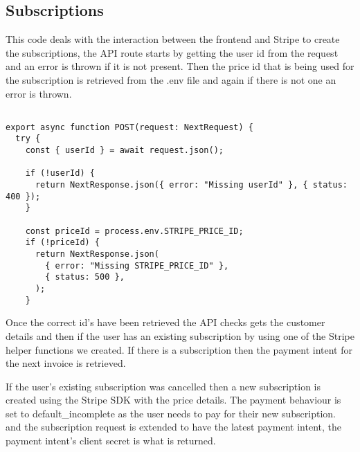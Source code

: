 \documentclass[]{project_report}
\begin{document}
\subsection{Subscriptions}

This code deals with the interaction between the frontend and Stripe to create the subscriptions, the API route starts by getting the user id from the request and an error is thrown if it is not present. Then the price id that is being used for the subscription is retrieved from the .env file and again if there is not one an error is thrown.

\begin{verbatim}

export async function POST(request: NextRequest) {
  try {
    const { userId } = await request.json();

    if (!userId) {
      return NextResponse.json({ error: "Missing userId" }, { status: 400 });
    }

    const priceId = process.env.STRIPE_PRICE_ID;
    if (!priceId) {
      return NextResponse.json(
        { error: "Missing STRIPE_PRICE_ID" },
        { status: 500 },
      );
    }

\end{verbatim}

Once the correct id's have been retrieved the API checks gets the customer details and then if the user has an existing subscription by using one of the Stripe helper functions we created. If there is a subscription then the payment intent for the next invoice is retrieved.

If the user's existing subscription was cancelled then a new subscription is created using the Stripe SDK with the price details. The payment behaviour is set to default\_incomplete as the user needs to pay for their new subscription. and the subscription request is extended to have the latest payment intent, the payment intent's client secret is what is returned.
\end{document}
